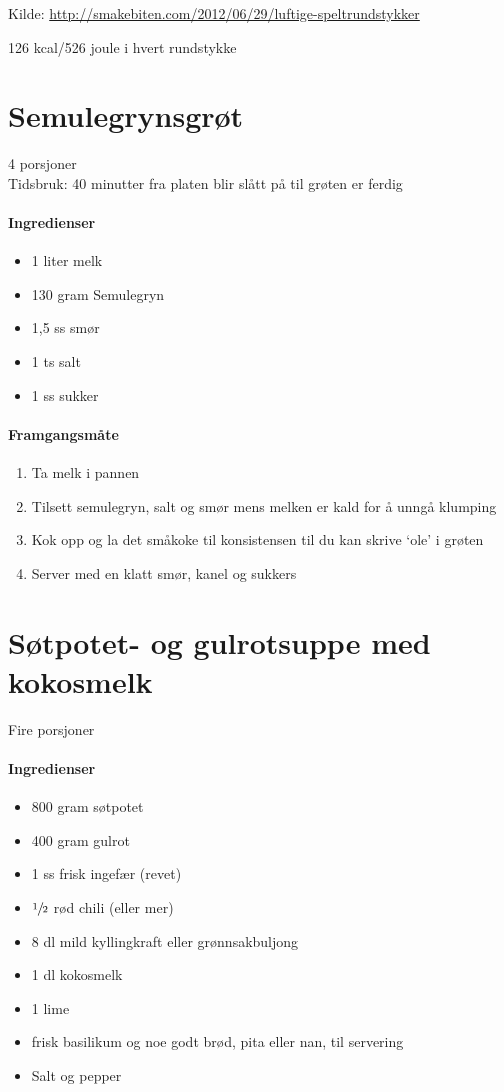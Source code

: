 \documentclass[12pt,a4paper]{book}
\begin{document}
Kilde: \url{http://smakebiten.com/2012/06/29/luftige-speltrundstykker}


126 kcal/526 joule i hvert rundstykke
\clearpage{}
\clearpage{}\section{﻿Semulegrynsgrøt}
4 porsjoner\\
Tidsbruk: 40 minutter fra platen blir slått på til grøten er ferdig

\paragraph{Ingredienser}
\begin{itemize}[noitemsep]
	\item 1 liter melk
	\item 130 gram Semulegryn
	\item 1,5 ss smør
	\item 1 ts salt
	\item 1 ss sukker
\end{itemize}

\paragraph{Framgangsmåte}
\begin{enumerate}[noitemsep]
	\item Ta melk i pannen
	\item Tilsett semulegryn, salt og smør mens melken er kald for å unngå klumping
	\item Kok opp og la det småkoke til konsistensen til du kan skrive `ole' i grøten
	\item Server med en klatt smør, kanel og sukkers
\end{enumerate}
\clearpage{}
\clearpage{}\section{﻿Søtpotet- og gulrotsuppe med kokosmelk}
\label{sotpotetSuppe}
Fire porsjoner\\

\paragraph{Ingredienser}
\begin{itemize}[noitemsep]
	    	\item 800 gram søtpotet
	    	\item 400 gram gulrot
	    	\item 1 ss frisk ingefær (revet)
	    	\item $\sfrac{1}{2}$ rød chili (eller mer)
	    	\item 8 dl mild kyllingkraft eller grønnsakbuljong
	    	\item 1 dl kokosmelk
	    	\item 1 lime
	    	\item frisk basilikum og noe godt brød, pita eller nan, til servering
			  \item Salt og pepper
\end{itemize}
\end{document}

